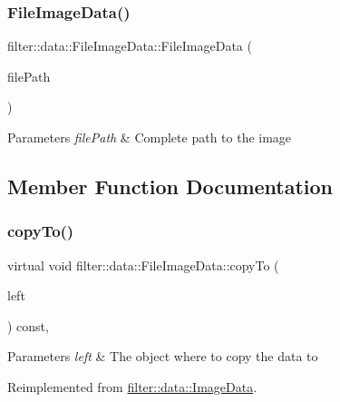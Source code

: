 \subsubsection{\texorpdfstring{File\+Image\+Data()}{FileImageData()}\hspace{0.1cm}{\footnotesize\ttfamily [2/2]}}
{\footnotesize\ttfamily filter\+::data\+::\+File\+Image\+Data\+::\+File\+Image\+Data (\begin{DoxyParamCaption}\item[{const std\+::string \&}]{file\+Path }\end{DoxyParamCaption})\hspace{0.3cm}{\ttfamily [inline]}}


\begin{DoxyParams}{Parameters}
{\em file\+Path} & Complete path to the image \\
\hline
\end{DoxyParams}


\subsection{Member Function Documentation}
\mbox{\label{classfilter_1_1data_1_1_file_image_data_a188f2f5ab66877f6ba553cc847cd5f07}} 
\subsubsection{\texorpdfstring{copy\+To()}{copyTo()}}
{\footnotesize\ttfamily virtual void filter\+::data\+::\+File\+Image\+Data\+::copy\+To (\begin{DoxyParamCaption}\item[{\hyperlink{classfilter_1_1data_1_1_image_data}{Image\+Data} \&}]{left }\end{DoxyParamCaption}) const\hspace{0.3cm}{\ttfamily [inline]}, {\ttfamily [virtual]}}


\begin{DoxyParams}{Parameters}
{\em left} & The object where to copy the data to \\
\hline
\end{DoxyParams}


Reimplemented from \hyperlink{classfilter_1_1data_1_1_image_data_ab035bfe80f8f6a6470046eb15fad7dfb}{filter\+::data\+::\+Image\+Data}.


